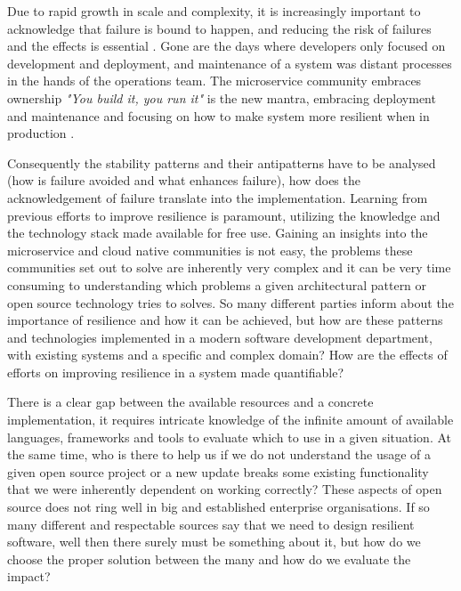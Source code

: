 Due to rapid growth in scale and complexity, it is increasingly important to acknowledge that failure is bound to happen, and reducing the risk of failures and the effects is essential \cite{abid2014toward} \cite[p. 117]{nygard2007release} \cite{tseitlin2013antifragile} \cite{krishnan2012weathering}. Gone are the days where developers only focused on development and deployment, and maintenance of a system was distant processes in the hands of the operations team. The microservice community embraces ownership \textit{"You build it, you run it"} \cite{gray2006conversation} is the new mantra, embracing deployment and maintenance and focusing on how to make system more resilient when in production \cite[p.~6]{nygard2007release}. 

Consequently the stability patterns and their antipatterns have to be analysed (how is failure avoided and what enhances failure), how does the acknowledgement of failure translate into the implementation. Learning from previous efforts to improve resilience is paramount, utilizing the knowledge and the technology stack made available for free use. Gaining an insights into the microservice and cloud native communities is not easy, the problems these communities set out to solve are inherently very complex and it can be very time consuming to understanding which problems a given architectural pattern or open source technology tries to solves. So many different parties inform about the importance of resilience and how it can be achieved, but how are these patterns and technologies implemented in a modern software development department, with existing systems and a specific and complex domain? How are the effects of efforts on improving resilience in a system made quantifiable?

There is a clear gap between the available resources and a concrete implementation, it requires intricate knowledge of the infinite amount of available languages, frameworks and tools to evaluate which to use in a given situation. 
At the same time, who is there to help us if we do not understand the usage of a given open source project or a new update breaks some existing functionality that we were inherently dependent on working correctly? These aspects of open source does not ring well in big and established enterprise organisations. If so many different and respectable sources say that we need to design resilient software, well then there surely must be something about it, but how do we choose the proper solution between the many and how do we evaluate the impact?

